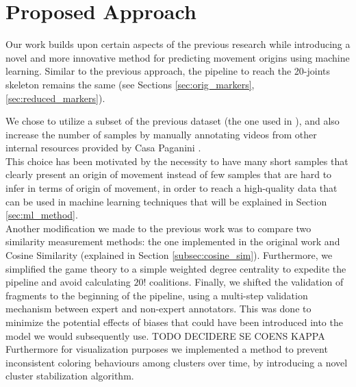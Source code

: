 \chapter{Proposed Approach}

Our work builds upon certain aspects of the previous research while introducing a novel and more innovative method for predicting movement origins using machine learning. 
Similar to the previous approach, the pipeline to reach the 20-joints skeleton remains the same (see Sections \ref{sec:orig_markers}, \ref{sec:reduced_markers}).

We chose to utilize a subset of the previous dataset (the one used in \cite{kolykhalova:2020}), and also increase the number of samples by manually annotating videos from other internal resources provided by Casa Paganini \cite{casaPaganini}.\\ 
This choice has been motivated by the necessity to have many short samples that clearly present an origin of movement instead of few samples that are hard to infer in terms of origin of movement, in order to 
reach a high-quality data that can be used in machine learning techniques that will be explained in Section \ref{sec:ml_method}.\\

Another modification we made to the previous work was to compare two similarity measurement methods: the one implemented in the original work and Cosine Similarity (explained in Section \ref{subsec:cosine_sim}).
Furthermore, we simplified the game theory to a simple weighted degree centrality to expedite the pipeline and avoid calculating $20!$ coalitions.
Finally, we shifted the validation of fragments to the beginning of the pipeline, using a multi-step validation mechanism between expert and non-expert annotators. 
This was done to minimize the potential effects of biases that could have been introduced into the model we would subsequently use.
TODO DECIDERE SE COENS KAPPA
Furthermore for visualization purposes we implemented a method to prevent inconsistent coloring behaviours among clusters over time, by introducing a novel cluster stabilization algorithm. 

